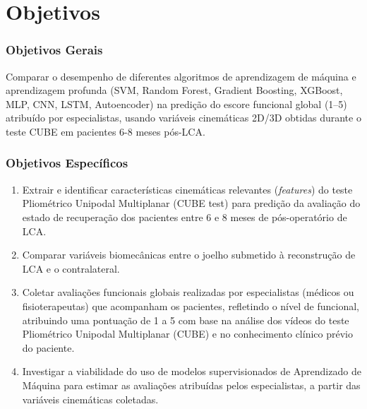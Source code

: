 \documentclass{article}
\begin{document}
\section{Objetivos}

\subsubsection{Objetivos Gerais}

\noindent Comparar o desempenho de diferentes algoritmos de aprendizagem de máquina e aprendizagem profunda (SVM, Random Forest, Gradient Boosting, XGBoost, MLP, CNN, LSTM, Autoencoder) na predição do escore funcional global (1–5) atribuído por especialistas, usando variáveis cinemáticas 2D/3D obtidas durante o teste CUBE em pacientes 6-8 meses pós-LCA. 


\subsubsection{Objetivos Específicos}
    \begin{enumerate}
        \item Extrair e identificar características cinemáticas relevantes (\textit{features}) do teste Pliométrico Unipodal Multiplanar (CUBE test) para predição da avaliação do estado de recuperação dos pacientes entre 6 e 8 meses de pós-operatório de LCA.

        \item Comparar variáveis biomecânicas entre o joelho submetido à reconstrução de LCA e o contralateral. 

        \item Coletar avaliações funcionais globais realizadas por especialistas (médicos ou fisioterapeutas) que acompanham os pacientes, refletindo o nível de funcional, atribuindo uma pontuação de 1 a 5 com base na análise dos vídeos do teste Pliométrico Unipodal Multiplanar (CUBE) e no conhecimento clínico prévio do paciente.

        \item Investigar a viabilidade do uso de modelos supervisionados de Aprendizado de Máquina para estimar as avaliações atribuídas pelos especialistas, a partir das variáveis cinemáticas coletadas.
    \end{enumerate}
\end{document}
